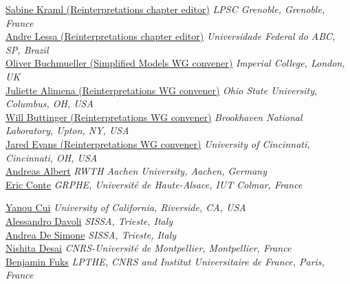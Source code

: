 \noindent\href{mailto:sabine.kraml@lpsc.in2p3.fr}{Sabine Kraml (Reinterpretations chapter editor)} 
\emph{LPSC Grenoble, Grenoble, France }\\ 

\noindent\href{mailto:andre.lessa@ufabc.edu.br}{Andre Lessa (Reinterpretations chapter editor)} 
\emph{Universidade Federal do ABC, SP, Brazil }\\

\noindent\href{mailto:o.buchmueller@imperial.ac.uk}{Oliver Buchmueller (Simplified Models WG convener)} 
\emph{Imperial College, London, UK}\\

\noindent\href{mailto:juliette.alimena@cern.ch }{Juliette Alimena (Reinterpretations WG convener)} 
\emph{Ohio State University, Columbus, OH, USA}\\

\noindent\href{mailto:William.Buttinger@cern.ch}{Will Buttinger (Reinterpretations WG convener)} 
\emph{Brookhaven National Laboratory, Upton, NY, USA}\\

\noindent\href{mailto:jaevans@ucdavis.edu}{Jared Evans (Reinterpretations WG convener)} 
\emph{University of Cincinnati, Cincinnati, OH, USA}\\

\noindent\href{mailto:albert@physik.rwth-aachen.de}{Andreas Albert} 
\emph{RWTH Aachen University, Aachen, Germany}\\


\noindent\href{mailto:eric.conte@iphc.cnrs.fr}{Eric Conte}
\emph{GRPHE, Universit\'{e} de Haute-Alsace, IUT Colmar, France}

\noindent\href{mailto:yanou.cui@ucr.edu}{Yanou Cui} 
\emph{University of California, Riverside, CA, USA}\\

\noindent\href{mailto:alessandro.davoli@sissa.it}{Alessandro Davoli} 
\emph{SISSA, Trieste, Italy}\\

\noindent\href{mailto:andrea.desimone@sissa.it}{Andrea De Simone} 
\emph{SISSA, Trieste, Italy}\\

\noindent\href{mailto:nishita.desai@umontpellier.fr}{Nishita Desai} 
\emph{CNRS-Universit\'e de Montpellier, Montpellier, France}\\

\noindent\href{mailto:fuks@lpthe.jussieu.fr}{Benjamin Fuks}
\emph{ LPTHE, CNRS and Institut Universitaire de France, Paris, France}

